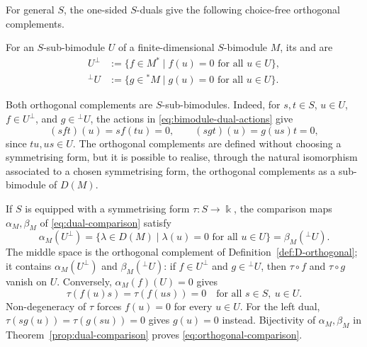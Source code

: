 \begin{advanced}
For general $S$, the one-sided $S$-duals give the following choice-free orthogonal complements.

\begin{definition}\label{def:orthogonals}
For an $S$-sub-bimodule $U$ of a finite-dimensional $S$-bimodule $M$, its  and  are
\[
\begin{aligned}
U^\perp&:=\{f\in M^*\mid f(u)=0\text{ for all }u\in U\},\\
{}^\perp U&:=\{g\in{}^*M\mid g(u)=0\text{ for all }u\in U\}.
\end{aligned}
\]
\end{definition}

Both orthogonal complements are $S$-sub-bimodules.
Indeed, for $s,t\in S$, $u\in U$, $f\in U^\perp$, and $g\in{}^\perp U$, the actions in \eqref{eq:bimodule-dual-actions} give
\[
(sft)(u)=sf(tu)=0,\qquad
(sgt)(u)=g(us)t=0,
\]
since $tu,us\in U$.
The orthogonal complements are defined without choosing a symmetrising form, but it is possible to realise, through the natural isomorphism associated to a chosen symmetrising form, the orthogonal complements as a sub-bimodule of $D(M)$.

If $S$ is equipped with a symmetrising form $\tau:S\to\Bbbk$, the comparison maps $\alpha_M,\beta_M$ of \eqref{eq:dual-comparison} satisfy
\begin{equation}\label{eq:orthogonal-comparison}
\alpha_M(U^\perp)=\{\lambda\in D(M)\mid\lambda(u)=0\text{ for all }u\in U\}=\beta_M({}^\perp U)
.
\end{equation}
The middle space is the orthogonal complement of Definition~\ref{def:D-orthogonal}; it contains $\alpha_M(U^\perp)$ and $\beta_M({}^\perp U)$: if $f\in U^\perp$ and $g\in{}^\perp U$, then $\tau\circ f$ and $\tau\circ g$ vanish on $U$.
Conversely, $\alpha_M(f)(U)=0$ gives
\[
\tau(f(u)s)=\tau(f(us))=0
\quad\text{for all }s\in S,\ u\in U.
\]
Non-degeneracy of $\tau$ forces $f(u)=0$ for every $u\in U$.
For the left dual, $\tau(sg(u))=\tau(g(su))=0$ gives $g(u)=0$ instead.
Bijectivity of $\alpha_M,\beta_M$ in Theorem~\ref{prop:dual-comparison} proves \eqref{eq:orthogonal-comparison}.
\end{advanced}

